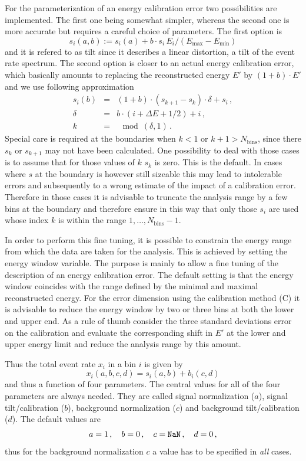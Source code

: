 For the parameterization of an energy calibration error two possibilities
are implemented. The first one being somewhat simpler, whereas the second one
is more accurate but requires a careful choice of parameters. The first 
option is
\begin{equation}
s_i(a,b):=s_i(a)+b\cdot s_i\, E_i/(E_\mathrm{max}-E_\mathrm{min})
\end{equation}
and it is refered to as tilt since it describes a linear distortion, a tilt
of the event rate spectrum. The second option is closer to an actual energy
calibration error, which basically amounts to replacing the reconstructed 
energy $E'$ by $(1+b)\cdot E'$ and we use following approximation
\begin{eqnarray}
s_i(b)&=& (1+b)\cdot(s_{k+1}-s_k)\cdot\delta+s_i\,,\\
\delta&=&b\cdot(i+\Delta E+ 1/2)+i\,,\nonumber\\
k&=&\mod(\delta,1)\,.\nonumber
\end{eqnarray}
Special care is required at the boundaries when $k<1$ or $k+1>N_\mathrm{bins}$,
since there $s_k$ or $s_{k+1}$ may not have been calculated. One possibility
to deal with those cases is to assume that for those values of $k$ $s_k$ is
zero. This is the default. In cases where $s$ at the boundary is however still
sizeable this may lead to intolerable errors and subsequently to a wrong
estimate of the impact of a calibration error. Therefore in those cases it
is advisable to truncate the analysis range by a few bins at the boundary
and therefore ensure in this way that only those $s_i$ are used whose index
$k$ is within the range $1,\ldots, N_\mathrm{bins}-1$. 

In order to perform this fine tuning, it is possible to constrain 
the energy range from which the data are taken for the 
analysis. This is achieved by setting the energy window
variable. The purpose is mainly to allow a fine tuning of the description
of an energy calibration error. The default setting is that the energy window
coincides with the range defined by the minimal and maximal reconstructed 
energy. For the error dimension using the calibration method (C) it is 
advisable to reduce the energy window by two or three bins at both the lower
and upper end. As a rule of
thumb consider the three standard deviations error on the calibration and
evaluate the corresponding shift in $E'$ at the lower and upper energy limit 
and reduce the analysis range by this amount.

Thus the total event rate $x_i$ in a bin $i$ is given by
\begin{equation}
x_i(a,b,c,d)=s_i(a,b)+b_i(c,d)
\end{equation}
and thus a function of four parameters. The central values for all of
the four parameters are always needed. They are called signal normalization
($a$), signal tilt/calibration ($b$), background  normalization ($c$) and
background tilt/calibration ($d$). The default values are
\begin{equation}
a=1\,,\quad b=0\,,\quad c={\tt NaN}\,,\quad d=0\,,
\end{equation}
thus for the background normalization $c$ a value has to be specified in 
\emph{all} cases.

